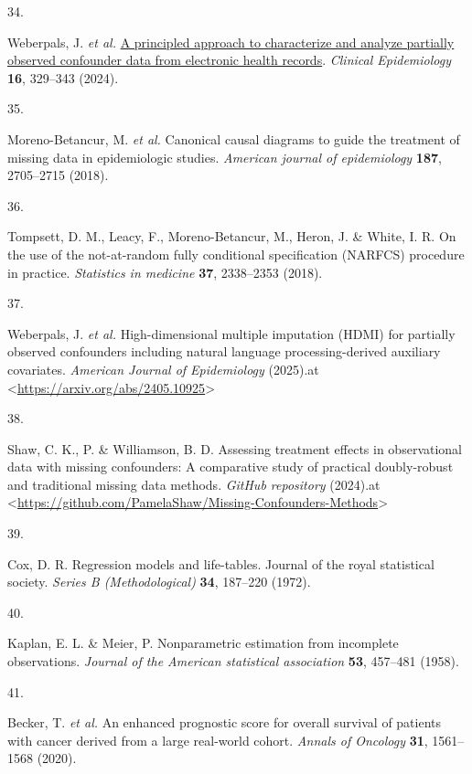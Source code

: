 \documentclass[
  letterpaper,
  DIV=11,
  numbers=noendperiod]{scrartcl}
\newlength{\cslhangindent}
\newlength{\csllabelwidth}
\newenvironment{CSLReferences}[2] %
 {\begin{list}{}{%
  \setlength{\itemindent}{0pt}
  \setlength{\leftmargin}{0pt}
  \setlength{\parsep}{0pt}
  \ifodd #1
   \setlength{\leftmargin}{\cslhangindent}
   \setlength{\itemindent}{-1\cslhangindent}
  \fi
  \setlength{\itemsep}{#2\baselineskip}}}
 {\end{list}}
\newcommand{\CSLLeftMargin}[1]{\parbox[t]{\csllabelwidth}{\strut#1\strut}}
\newcommand{\CSLRightInline}[1]{\parbox[t]{\linewidth - \csllabelwidth}{\strut#1\strut}}
\begin{document}
\begin{CSLReferences}{0}{0}
\CSLLeftMargin{34. }%
\CSLRightInline{Weberpals, J. \emph{et al.}
\href{https://doi.org/10.2147/CLEP.S436131}{A principled approach to
characterize and analyze partially observed confounder data from
electronic health records}. \emph{Clinical Epidemiology} \textbf{16},
329--343 (2024).}

\CSLLeftMargin{35. }%
\CSLRightInline{Moreno-Betancur, M. \emph{et al.} Canonical causal
diagrams to guide the treatment of missing data in epidemiologic
studies. \emph{American journal of epidemiology} \textbf{187},
2705--2715 (2018).}

\CSLLeftMargin{36. }%
\CSLRightInline{Tompsett, D. M., Leacy, F., Moreno-Betancur, M., Heron,
J. \& White, I. R. On the use of the not-at-random fully conditional
specification (NARFCS) procedure in practice. \emph{Statistics in
medicine} \textbf{37}, 2338--2353 (2018).}

\CSLLeftMargin{37. }%
\CSLRightInline{Weberpals, J. \emph{et al.} High-dimensional multiple
imputation (HDMI) for partially observed confounders including natural
language processing-derived auxiliary covariates. \emph{American Journal
of Epidemiology} (2025).at
\textless{}\url{https://arxiv.org/abs/2405.10925}\textgreater{}}

\CSLLeftMargin{38. }%
\CSLRightInline{Shaw, C. K., P. \& Williamson, B. D. Assessing treatment
effects in observational data with missing confounders: A comparative
study of practical doubly-robust and traditional missing data methods.
\emph{GitHub repository} (2024).at
\textless{}\url{https://github.com/PamelaShaw/Missing-Confounders-Methods}\textgreater{}}

\CSLLeftMargin{39. }%
\CSLRightInline{Cox, D. R. Regression models and life-tables. Journal of
the royal statistical society. \emph{Series B (Methodological)}
\textbf{34}, 187--220 (1972).}

\CSLLeftMargin{40. }%
\CSLRightInline{Kaplan, E. L. \& Meier, P. Nonparametric estimation from
incomplete observations. \emph{Journal of the American statistical
association} \textbf{53}, 457--481 (1958).}

\CSLLeftMargin{41. }%
\CSLRightInline{Becker, T. \emph{et al.} An enhanced prognostic score
for overall survival of patients with cancer derived from a large
real-world cohort. \emph{Annals of Oncology} \textbf{31}, 1561--1568
(2020).}


\end{CSLReferences}
\end{document}
